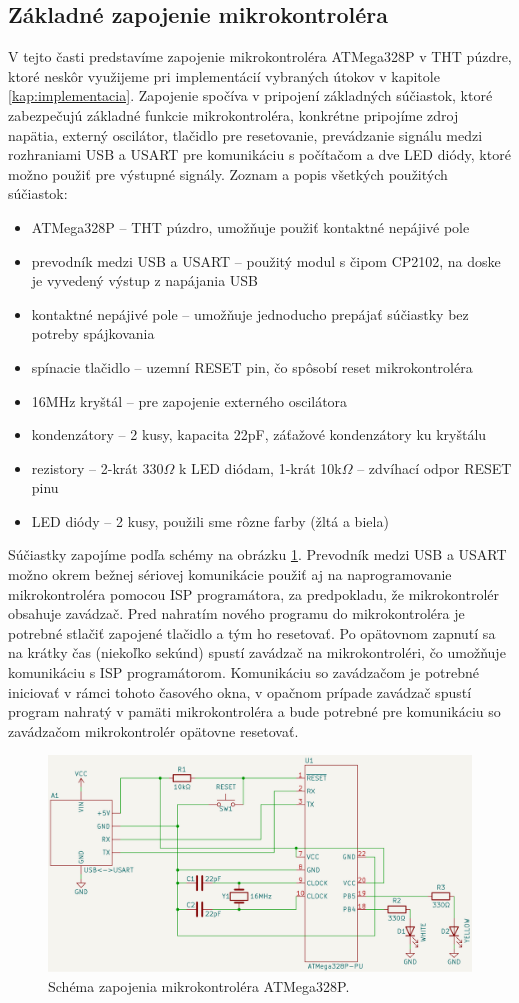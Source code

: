 \subsection{Základné zapojenie mikrokontroléra}
V tejto časti predstavíme zapojenie mikrokontroléra ATMega328P v THT púzdre, ktoré neskôr využijeme pri implementácií vybraných útokov v kapitole \ref{kap:implementacia}. Zapojenie spočíva v pripojení základných súčiastok, ktoré zabezpečujú základné funkcie mikrokontroléra, konkrétne pripojíme zdroj napätia, externý oscilátor, tlačidlo pre resetovanie, prevádzanie signálu medzi rozhraniami USB a USART pre komunikáciu s počítačom a dve LED diódy, ktoré možno použiť pre výstupné signály. Zoznam a popis všetkých použitých súčiastok:
\begin{itemize}
    \item ATMega328P -- THT púzdro, umožňuje použiť kontaktné nepájivé pole
    \item prevodník medzi USB a USART -- použitý modul s čipom CP2102, na doske je vyvedený výstup z napájania USB
    \item kontaktné nepájivé pole -- umožňuje jednoducho prepájať súčiastky bez potreby spájkovania
    \item spínacie tlačidlo -- uzemní RESET pin, čo spôsobí reset mikrokontroléra
    \item 16MHz kryštál -- pre zapojenie externého oscilátora
    \item kondenzátory -- 2 kusy, kapacita 22pF, záťažové kondenzátory ku kryštálu
    \item rezistory -- 2-krát 330$\Omega$ k LED diódam, 1-krát 10k$\Omega$ -- zdvíhací odpor RESET pinu
    \item LED diódy -- 2 kusy, použili sme rôzne farby (žltá a biela)
\end{itemize}
Súčiastky zapojíme podľa schémy na obrázku \ref{obr:schemeATMega}. Prevodník medzi USB a USART možno okrem bežnej sériovej komunikácie použiť aj na naprogramovanie mikrokontroléra pomocou ISP programátora, za predpokladu, že mikrokontrolér obsahuje zavádzač. Pred nahratím nového programu do mikrokontroléra je potrebné stlačiť zapojené tlačidlo a tým ho resetovať. Po opätovnom zapnutí sa na krátky čas (niekoľko sekúnd) spustí zavádzač na mikrokontroléri, čo umožňuje komunikáciu s ISP programátorom. Komunikáciu so zavádzačom je potrebné iniciovať v rámci tohoto časového okna, v opačnom prípade zavádzač spustí program nahratý v pamäti mikrokontroléra a bude potrebné pre komunikáciu so zavádzačom mikrokontrolér opätovne resetovať.

\begin{figure}
    \centerline{\includegraphics[width=1\textwidth]{images/schemeATMega.png}}
    \caption[Schéma zapojenia mikrokontroléra ATMega328P.]{Schéma zapojenia mikrokontroléra ATMega328P.}
    \label{obr:schemeATMega}
\end{figure}